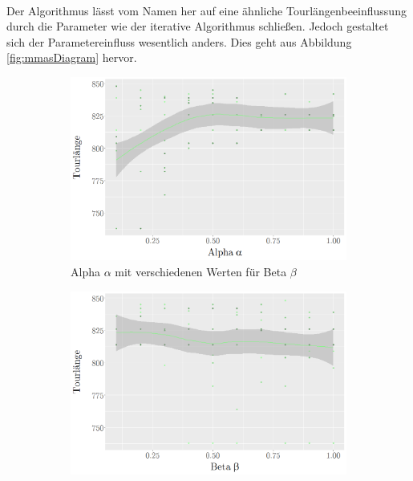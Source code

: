 \documentclass[doktyp=barbeit, sprache=german]{TUBAFarbeiten}
\begin{document}
\\Der Algorithmus lässt vom Namen her auf eine ähnliche Tourlängenbeeinflussung durch die Parameter wie der iterative Algorithmus schließen. Jedoch gestaltet sich der Parametereinfluss wesentlich anders. Dies geht aus Abbildung \ref{fig:mmasDiagram} hervor. 
\begin{figure}[!]
        \centering
        \begin{subfigure}[b]{0.475\textwidth}
            \centering
            \includegraphics[width=\textwidth]{images/diagrammmasalpha}
            \caption{Alpha $\alpha$ mit verschiedenen Werten für Beta $\beta$}               
            \label{fig:iterativeAlpha}
        \end{subfigure}
        \hfill
        \begin{subfigure}[b]{0.475\textwidth}  
            \centering 
            \includegraphics[width=\textwidth]{images/diagrammmasbeta}

\end{subfigure}
\end{figure}
\end{document}
